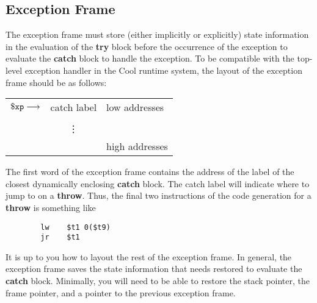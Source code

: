 \documentclass[11pt]{article}
\def\C#1{{\bf{}#1}}
\newcommand{\Throw}{\C{throw}\xspace}
\newcommand{\Try}{\C{try}\xspace}
\newcommand{\Catch}{\C{catch}\xspace}
\begin{document}
\subsection{Exception Frame}

The exception frame must store (either implicitly or explicitly) state
information in the evaluation of the \Try block before the occurrence
of the exception to evaluate the \Catch block to handle the exception.
To be compatible with the top-level exception handler in the Cool
runtime system, the layout of the exception frame should be as
follows:
\begin{center}
\begin{tabular}{l|c|l}
\cline{2-2}
  $\mathtt{\$xp} \longrightarrow$ & catch label & low addresses \\ \cline{2-2}
  & \\
  & \vdots \\
  & & high addresses \\
\cline{2-2}
\end{tabular}
\end{center}
The first word of the exception frame contains the address of the
label of the closest dynamically enclosing \Catch block.  The catch
label will indicate where to jump to on a \Throw.  Thus, the final two
instructions of the code generation for a \Throw is something like
\begin{verbatim}
        lw    $t1 0($t9)
        jr    $t1
\end{verbatim}

It is up to you how to layout the rest of the exception frame.  In
general, the exception frame saves the state information that needs
restored to evaluate the \Catch block.  Minimally, you will need to be
able to restore the stack pointer, the frame pointer, and a pointer to
the previous exception frame.

\end{document}
